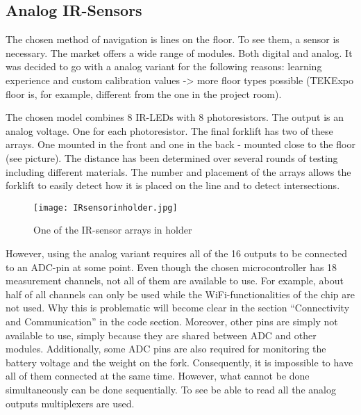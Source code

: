 \documentclass[../report.tex]{subfiles}
\begin{document}
\subsection{Analog IR-Sensors}
The chosen method of navigation is lines on the floor. To see them, a sensor is necessary.
The market offers a wide range of modules. Both digital and analog. It was decided to go with 
a analog variant for the following reasons: learning experience and custom calibration values -> more
floor types possible (TEKExpo floor is, for example, different from the one in the project room).  

The chosen model combines 8 IR-LEDs with 8 photoresistors. The output is an analog voltage. One for each photoresistor.
The final forklift has two of these arrays. One mounted in the front and one in the back - mounted
close to the floor (see picture). The distance has been determined over several rounds of testing 
including different materials. The number and placement of the arrays allows the forklift to easily detect
how it is placed on the line and to detect intersections.  
\begin{figure}[h!]
    \centering
    \texttt{[image: IRsensorinholder.jpg]}
    \caption{One of the IR-sensor arrays in holder}
 \end{figure}

However, using the analog variant requires all of the 16 outputs to be connected to an ADC-pin at some point.
Even though the chosen microcontroller has 18 measurement channels, not all of them are available to use.
For example, about half of all channels can only be used while the WiFi-functionalities of the chip are not used.
Why this is problematic will become clear in the section ``Connectivity and Communication'' in the code section.
Moreover, other pins are simply not available to use, simply because they are shared between ADC and other modules.
Additionally, some ADC pins are also required for monitoring the battery voltage and the weight on the fork.
Consequently, it is impossible to have all of them connected at the same time. However, what cannot be done 
simultaneously can be done sequentially. To see be able to read all the analog outputs multiplexers are used.
\end{document}

